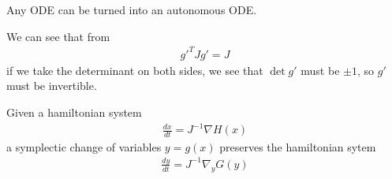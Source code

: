 Any ODE can be turned into an autonomous ODE.


We can see that from
\begin{align*}
  g'^T Jg' = J
\end{align*}
if we take the determinant on both sides, we see that $\det g'$ must be $\pm 1$, so $g'$ must be invertible.

Given a hamiltonian system
\begin{align*}
  \frac{d x}{d t} = J^{-1} \nabla H(x)
\end{align*}
a symplectic change of variables $y = g(x)$ preserves the hamiltonian sytem
\begin{align*}
  \frac{d y}{d t} = J^{-1} \nabla_y G(y)
\end{align*}



